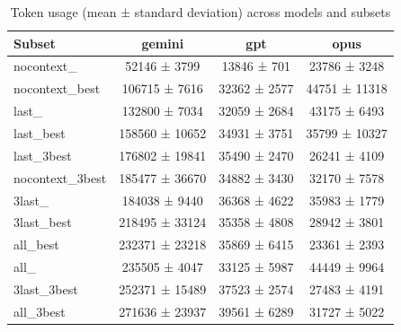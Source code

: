 \begin{table}[ht]
\centering
\caption{Token usage (mean ± standard deviation) across models and subsets}
\label{tab:token_stats}
\begin{tabular}{lccc}
\toprule
Subset & gemini & gpt & opus \\
\midrule
nocontext\_ & 52146 ± 3799 & 13846 ± 701 & 23786 ± 3248 \\
nocontext\_best & 106715 ± 7616 & 32362 ± 2577 & 44751 ± 11318 \\
last\_ & 132800 ± 7034 & 32059 ± 2684 & 43175 ± 6493 \\
last\_best & 158560 ± 10652 & 34931 ± 3751 & 35799 ± 10327 \\
last\_3best & 176802 ± 19841 & 35490 ± 2470 & 26241 ± 4109 \\
nocontext\_3best & 185477 ± 36670 & 34882 ± 3430 & 32170 ± 7578 \\
3last\_ & 184038 ± 9440 & 36368 ± 4622 & 35983 ± 1779 \\
3last\_best & 218495 ± 33124 & 35358 ± 4808 & 28942 ± 3801 \\
all\_best & 232371 ± 23218 & 35869 ± 6415 & 23361 ± 2393 \\
all\_ & 235505 ± 4047 & 33125 ± 5987 & 44449 ± 9964 \\
3last\_3best & 252371 ± 15489 & 37523 ± 2574 & 27483 ± 4191 \\
all\_3best & 271636 ± 23937 & 39561 ± 6289 & 31727 ± 5022 \\
\bottomrule
\end{tabular}
\end{table}